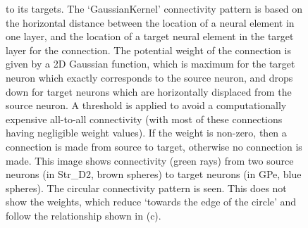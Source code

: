 \documentclass{frontiersSCNS}
\begin{document}
\begin{figure}[htb!]
{to its targets.  The `GaussianKernel'
connectivity pattern is based on the horizontal distance between the
location of a neural element in one layer, and the location of a
target neural element in the target layer for the connection. The
potential weight of the connection is given by a 2D Gaussian function,
which is maximum for the target neuron which exactly corresponds to
the source neuron, and drops down for target neurons which are
horizontally displaced from the source neuron. A threshold is applied
to avoid a computationally expensive all-to-all connectivity (with
most of these connections having negligible weight values).  If the
weight is non-zero, then a connection is made from source to target,
otherwise no connection is made.  This
image shows connectivity (green rays) from two source neurons (in
Str\_D2, brown spheres) to target neurons (in GPe, blue spheres). The
circular connectivity pattern is seen. This does not show the weights,
which reduce `towards the edge of the circle' and follow the
relationship shown in (c).}
\end{figure}
\end{document}
